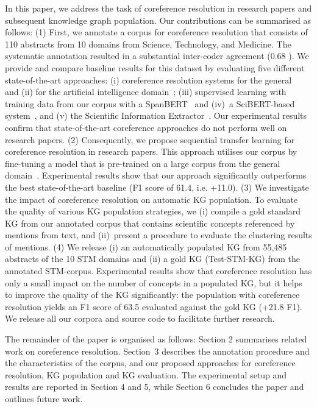\documentclass[runningheads]{llncs}
\begin{document}
In this paper, we address the task of coreference resolution in research papers and subsequent knowledge graph population. 
Our contributions can be summarised as follows:
(1) First, we annotate a corpus for coreference resolution that consists of 110 abstracts from 10 domains from Science, Technology, and Medicine. The systematic annotation resulted in a substantial inter-coder agreement (0.68 ). We provide and compare baseline results for this dataset by evaluating five different state-of-the-art approaches: (i) coreference resolution systems for the general~\cite{Joshi2020BFCR} and (ii) for the artificial intelligence domain~\cite{Luan2018MultiTaskIO};
(iii) supervised learning with training data from our corpus with a SpanBERT~\cite{Joshi2020SpanBERT} and (iv)~a SciBERT-based system~\cite{Beltagy2019SciBERTPC}, and (v) the Scientific Information Extractor~\cite{Luan2018MultiTaskIO}.
Our experimental results confirm that state-of-the-art coreference approaches do not perform well on research papers.
(2) Consequently, we propose sequential transfer learning for coreference resolution in research papers. This approach utilises our corpus by fine-tuning a model that is pre-trained on a large corpus from the general domain~\cite{Pradhan2013TowardsRL}.
Experimental results show that our approach significantly outperforms the best state-of-the-art baseline (F1 score of 61.4, i.e. +11.0). 
(3) We investigate the impact of coreference resolution on automatic KG population. To evaluate the quality of various KG population strategies, we (i) compile a gold standard KG from our annotated corpus that contains scientific concepts referenced by mentions from text, and (ii)~present a procedure to evaluate the clustering results of mentions.
(4) We release (i) an automatically populated KG from 55,485 abstracts of the 10 STM domains and (ii) a gold KG (Test-STM-KG) from the annotated STM-corpus. 
Experimental results show that coreference resolution has only a small impact on the number of concepts in a populated KG, but it helps to improve the quality of the KG significantly: the population with coreference resolution yields an F1 score of 63.5 evaluated against the gold KG (+21.8 F1).
We release all our corpora and source code to facilitate further research.

The remainder of the paper is organised as follows: Section 2 summarises related work on coreference resolution.
Section~3 describes the annotation procedure and the characteristics of the corpus, and our proposed approaches for coreference resolution, KG population and KG evaluation.
The experimental setup and results are reported in Section 4 and 5, while Section 6 concludes the paper and outlines future work. 
\end{document}
